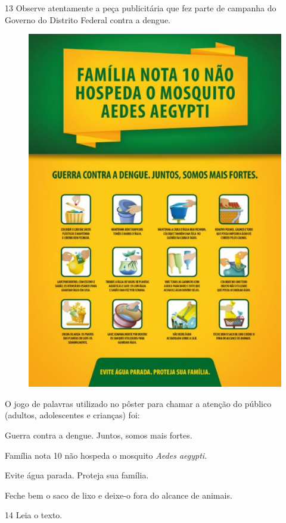 \num{13} Observe atentamente a peça publicitária que fez parte de campanha do
Governo do Distrito Federal contra a dengue.

\begin{figure}[htpb!]
\centering
\includegraphics[width=.5\textwidth]{./media/simulados/image2.jpeg}
\end{figure}


O jogo de palavras utilizado no pôster para chamar a atenção do público
(adultos, adolescentes e crianças) foi:

\begin{escolha}
\item Guerra contra a dengue. Juntos, somos mais fortes.

\item Família nota 10 não hospeda o mosquito \emph{Aedes aegypti}.

\item Evite água parada. Proteja sua família.

\item Feche bem o saco de lixo e deixe-o fora do alcance de animais.
\end{escolha}

\pagebreak
\num{14} Leia o texto.

